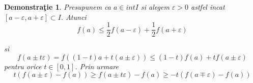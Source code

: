 \documentclass[a4paper,12pt,oneside]{report}
\newtheorem{demonstration}{Demonstra\c tie}
\begin{document}
\begin{demonstration}
Presupunem ca \(a\in  int I\) si alegem \(\varepsilon > 0\) astfel incat \(\left [ a - \varepsilon , a + \varepsilon  \right ] \subset I\).
Atunci  
\begin{displaymath}
  f\left ( a \right )\leq \frac{1}{2} f\left ( a - \varepsilon  \right ) + \frac{1}{2}f \left ( a + \varepsilon  \right )
\end{displaymath}

si 
\begin{displaymath}
  f\left ( a \pm t\varepsilon  \right )= f\left ( \left ( 1 - t \right ) a + t\left ( a \pm \varepsilon  \right )\right )\leq \left ( 1 - t \right )f\left ( a \right ) + tf\left ( a\pm \varepsilon  \right )
\end{displaymath}
pentru orice \(t\in \left [ 0 , 1 \right ]\). Prin urmare 
\begin{displaymath}
  t\left ( f\left ( a\pm \varepsilon  \right ) - f\left ( a \right ) \right )\geq f\left ( a\pm t\varepsilon  \right )- f\left ( a \right )\geq -t\left ( f\left ( a\mp \varepsilon  \right ) - f\left ( a \right )\right )
\end{displaymath}
\end{demonstration}



%
%
%
%
\end{document}
